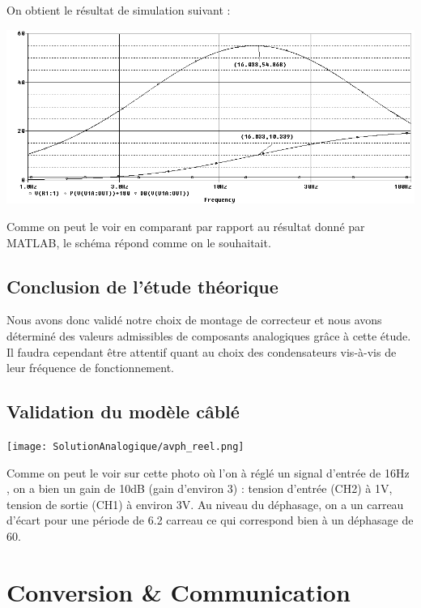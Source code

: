 \documentclass[11pt, french]{article} %
\begin{document}
On obtient le résultat de simulation suivant : 

\begin{center}
\includegraphics[width = 15cm]{SolutionAnalogique/orcad_simu.png} 
\end{center}


Comme on peut le voir en comparant par rapport au résultat donné par MATLAB, le schéma répond comme on le souhaitait. 

\vspace{0.5cm}
\subsection{Conclusion de l'étude théorique}

\noindent
Nous avons donc validé notre choix de montage de correcteur et nous avons déterminé des valeurs admissibles de composants analogiques grâce à cette étude. Il faudra cependant être attentif quant au choix des condensateurs vis-à-vis de leur fréquence de fonctionnement.  

\subsection{Validation du modèle câblé}

\vspace{0.5cm}

\begin{center}
\texttt{[image: SolutionAnalogique/avph\_reel.png]} 
\end{center}

Comme on peut le voir sur cette photo où l'on à réglé un signal d'entrée de 16Hz , on a bien un gain de 10dB (gain d'environ 3) : tension d'entrée (CH2) à 1V, tension de sortie (CH1) à environ 3V. Au niveau du déphasage, on a un carreau d'écart pour une période de 6.2 carreau ce qui correspond bien à un déphasage de 60. 


\section{Conversion \& Communication}
\end{document}
